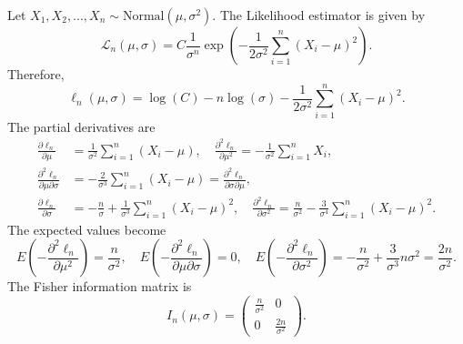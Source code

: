 Let $X_1, X_2, ..., X_n \sim \mathrm{Normal}(\mu, \sigma^2)$.
The Likelihood estimator is given by
\begin{equation*}
    \mathcal{L}_n(\mu, \sigma) = C \frac{1}{\sigma^n} \exp\left(-\frac{1}{2\sigma^2} \sum_{i=1}^n (X_i - \mu)^2\right).
\end{equation*}
Therefore,
\begin{equation*}
    \ell_n(\mu, \sigma) = \log(C) - n\log(\sigma) - \frac{1}{2\sigma^2} \sum_{i = 1}^n (X_i - \mu)^2.
\end{equation*}
The partial derivatives are
\begin{equation*}
    \begin{split}
        \frac{\partial \ell_n}{\partial \mu} &= \frac{1}{\sigma^2} \sum_{i = 1}^n (X_i - \mu), \quad
        \frac{\partial^2 \ell_n}{\partial \mu^2} = -\frac{1}{\sigma^2} \sum_{i = 1}^n X_i, \\
        \frac{\partial^2 \ell_n}{\partial \mu \partial \sigma} &= -\frac{2}{\sigma^3} \sum_{i = 1}^n (X_i - \mu) = \frac{\partial^2 \ell_n}{\partial \sigma \partial \mu}, \\
        \frac{\partial \ell_n}{\partial \sigma} &= -\frac{n}{\sigma} + \frac{1}{\sigma^3} \sum_{i = 1}^n (X_i - \mu)^2, \quad
        \frac{\partial^2 \ell_n}{\partial \sigma^2} = \frac{n}{\sigma^2} - \frac{3}{\sigma^4} \sum_{i = 1}^n (X_i - \mu)^2.
    \end{split}
\end{equation*}
The expected values become
\begin{equation*}
    E\left(-\frac{\partial^2 \ell_n}{\partial \mu^2}\right)
        = \frac{n}{\sigma^2}, \quad
    E\left(-\frac{\partial^2 \ell_n}{\partial \mu \partial \sigma}\right)
        = 0, \quad
    E\left(-\frac{\partial^2 \ell_n}{\partial \sigma^2}\right)
        = -\frac{n}{\sigma^2} + \frac{3}{\sigma^3} n\sigma^2
        = \frac{2n}{\sigma^2}.
\end{equation*}
The Fisher information matrix is
\begin{equation*}
    I_n(\mu, \sigma) = \left( \begin{matrix}
        \frac{n}{\sigma^2} & 0 \\
        0 & \frac{2n}{\sigma^2}
    \end{matrix} \right).
\end{equation*}
